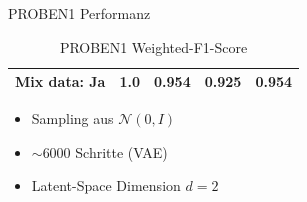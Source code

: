 \documentclass[10pt, compress]{beamer}
\begin{document}
\begin{frame}{PROBEN1 Performanz}
\begin{minipage}[c]{.49\textwidth}
\begin{table}[hbt]
{\begin{tabular}{l|c|c|c|c}
  Mix data: Ja   & 1.0                 & 0.954    & 0.925          & 0.954          \\
  \bottomrule
  \end{tabular}}
  \caption{PROBEN1 Weighted-F1-Score}
  \end{table}
  \end{minipage}
  \hfill
  \begin{minipage}[c]{.45\textwidth}
    \begin{itemize}
      \item Sampling aus $\mathcal{N}(0, I)$
      \item $\sim 6000$ Schritte (VAE)
      \item Latent-Space Dimension $d = 2$
    \end{itemize}
  \end{minipage}
\end{frame}
\end{document}

